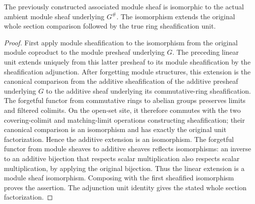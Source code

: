 \begin{theorem}
\label{hir:real-domain-actual-normal-associated-module-ring-sheaf-comparison}
\leanok
The previously constructed associated module sheaf is isomorphic to
the actual ambient module sheaf underlying $G^{\#}$. The isomorphism
extends the original whole section comparison followed by the true
ring sheafification unit.
\end{theorem}
\begin{proof}
First apply module sheafification to the isomorphism from the original
module coproduct to the module presheaf underlying $G$. The preceding
linear unit extends uniquely from this latter presheaf to its module
sheafification by the sheafification adjunction. After forgetting
module structures, this extension is the canonical comparison from
the additive sheafification of the additive presheaf underlying $G$
to the additive sheaf underlying its commutative-ring sheafification.
The forgetful functor from commutative rings to abelian groups preserves
limits and filtered colimits. On the open-set site, it therefore
commutes with the two covering-colimit and matching-limit operations
constructing sheafification; their canonical comparison is an
isomorphism and has exactly the original unit factorization. Hence
the additive extension is an isomorphism. The forgetful functor from
module sheaves to additive sheaves reflects isomorphisms: an inverse
to an additive bijection that respects scalar multiplication also
respects scalar multiplication, by applying the original bijection.
Thus the linear extension is a module sheaf isomorphism. Composing
with the first sheafified isomorphism proves the assertion. The
adjunction unit identity gives the stated whole section factorization.
\end{proof}

